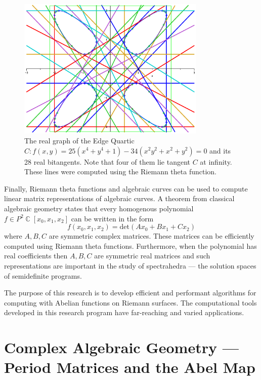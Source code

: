 \documentclass[10pt,twoside]{article}
\numberwithin{equation}{section}
\DeclareMathOperator{\CC}{\mathbb{C}}
\begin{document}
\begin{figure}[t]
  \centering
  \includegraphics[width=0.8\textwidth]{images/edgequartic}
  \caption{The real graph of the Edge Quartic $C: f(x,y) = 25(x^4+y^4+1)
    - 34(x^2y^2+x^2+y^2) = 0$ and its 28 real bitangents. Note that four
    of them lie tangent $C$ at infinity. These lines were computed using
    the Riemann theta function.}
  \label{fig: edge}
\end{figure}

Finally, Riemann theta functions and algebraic curves can be used to
compute linear matrix representations of algebraic curves. A theorem
from classical algebraic geometry states that every homogenous
polynomial $f \in P^2\CC[x_0,x_1,x_2]$ can be written in the form
\[
   f(x_0,x_1,x_2) = \text{det}
   \left( A x_0 + B x_1 + C x_2 \right)
\]
where $A,B,C$ are symmetric complex matrices. These matrices can be
efficiently computed using Riemann theta functions. Furthermore, when
the polynomial has real coefficients then $A,B,C$ are symmetric real
matrices and such representations are important in the study of
spectrahedra --- the solution spaces of semidefinite
programs. \cite{PSV10}

The purpose of this research is to develop efficient and performant
algorithms for computing with Abelian functions on Riemann surfaces. The
computational tools developed in this research program have far-reaching
and varied applications.


\section{Complex Algebraic Geometry --- Period Matrices and the Abel Map}
\end{document}
